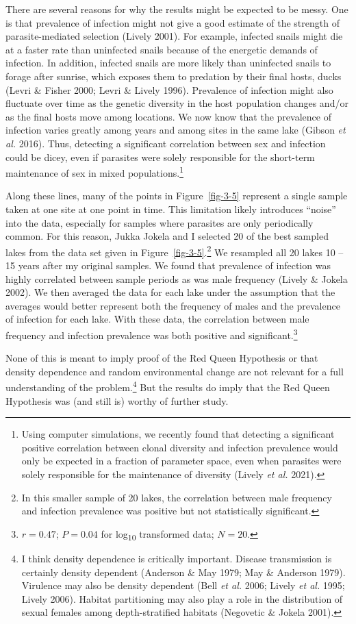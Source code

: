 \documentclass[
  letterpaper,
]{book}
\begin{document}
There are several reasons for why the results might be expected to be
messy. One is that prevalence of infection might not give a good
estimate of the strength of parasite-mediated selection (Lively 2001).
For example, infected snails might die at a faster rate than uninfected
snails because of the energetic demands of infection. In addition,
infected snails are more likely than uninfected snails to forage after
sunrise, which exposes them to predation by their final hosts, ducks
(Levri \& Fisher 2000; Levri \& Lively 1996). Prevalence of infection
might also fluctuate over time as the genetic diversity in the host
population changes and/or as the final hosts move among locations. We
now know that the prevalence of infection varies greatly among years and
among sites in the same lake (Gibson \emph{et al.} 2016). Thus,
detecting a significant correlation between sex and infection could be
dicey, even if parasites were solely responsible for the short-term
maintenance of sex in mixed populations.\footnote{Using computer
  simulations, we recently found that detecting a significant positive
  correlation between clonal diversity and infection prevalence would
  only be expected in a fraction of parameter space, even when parasites
  were solely responsible for the maintenance of diversity (Lively
  \emph{et al.} 2021).}

Along these lines, many of the points in Figure~\ref{fig-3-5} represent
a single sample taken at one site at one point in time. This limitation
likely introduces ``noise'' into the data, especially for samples where
parasites are only periodically common. For this reason, Jukka Jokela
and I selected 20 of the best sampled lakes from the data set given in
Figure~\ref{fig-3-5}.\footnote{In this smaller sample of 20 lakes, the
  correlation between male frequency and infection prevalence was
  positive but not statistically significant.} We resampled all 20 lakes
10 -- 15 years after my original samples. We found that prevalence of
infection was highly correlated between sample periods as was male
frequency (Lively \& Jokela 2002). We then averaged the data for each
lake under the assumption that the averages would better represent both
the frequency of males and the prevalence of infection for each lake.
With these data, the correlation between male frequency and infection
prevalence was both positive and significant.\footnote{\(r = 0.47\);
  \(P = 0.04\) for log\textsubscript{10} transformed data; \(N = 20\).}

None of this is meant to imply proof of the Red Queen Hypothesis or that
density dependence and random environmental change are not relevant for
a full understanding of the problem.\footnote{I think density dependence
  is critically important. Disease transmission is certainly density
  dependent (Anderson \& May 1979; May \& Anderson 1979). Virulence may
  also be density dependent (Bell \emph{et al.} 2006; Lively \emph{et
  al.} 1995; Lively 2006). Habitat partitioning may also play a role in
  the distribution of sexual females among depth-stratified habitats
  (Negovetic \& Jokela 2001).} But the results do imply that the Red
Queen Hypothesis was (and still is) worthy of further study.
\end{document}

